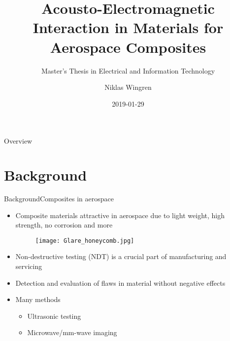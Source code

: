 \documentclass[11pt, final]{beamer}
\begin{document}
	
	\newcommand{\mrm}[1]{\mathrm{#1}}
	\newcommand{\eu}{\mrm{e}}
	\newcommand{\iu}{\mrm{i}}	
	
	\author{Niklas Wingren}
	\title[Acousto-Electromagnetic Interaction]{Acousto-Electromagnetic Interaction in Materials for Aerospace Composites}
	\subtitle{Master's Thesis in Electrical and Information Technology}
	\date{2019-01-29}
	\frame[plain]{\maketitle}
	
	\begin{frame}{Overview}
		\tableofcontents
	\end{frame}
	
	
	\section{Background}
	
	\begin{frame}{Background}{Composites in aerospace}
		\begin{itemize}
			\item Composite materials attractive in aerospace due to light weight, high strength, no corrosion and more
			\begin{figure}
				\texttt{[image: Glare\_honeycomb.jpg]}
			\end{figure}
			\pause
			\item Non-destructive testing (NDT) is a crucial part of manufacturing and servicing
			\item Detection and evaluation of flaws in material without negative effects
			\pause
			\item Many methods
			\begin{itemize}
				\item Ultrasonic testing
				\item Microwave/mm-wave imaging
			\end{itemize}
		\end{itemize}
		
	\end{frame}
	
\end{document}
